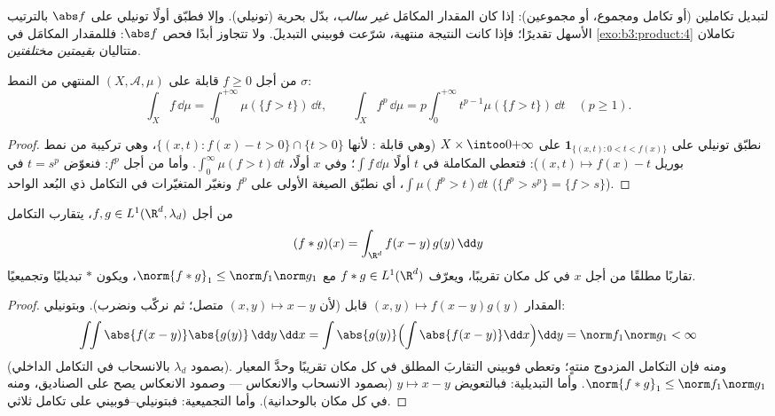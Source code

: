 \begin{method}\label{met:b3:product:fubini}
لتبديل تكاملين (أو تكامل ومجموع، أو مجموعين): إذا كان المقدار
المكامَل \emph{غير سالب}، بدّل بحرية (تونيلي). وإلا فطبّق أولًا
تونيلي على $\abs f$ بالترتيب الأسهل تقديرًا؛ فإذا كانت النتيجة
منتهية، شرّعت فوبيني التبديلَ. ولا تتجاوز أبدًا فحص $\abs f$:
فللمقدار المكامَل في \cref{exo:b3:product:4} تكاملان متتاليان \emph{بقيمتين
مختلفتين}.
\end{method}

\begin{proposition}\label{prop:b3:product:layercake}
من أجل $f \geq 0$ قابلة  على $(X, \mathcal A, \mu)$ المنتهي من النمط
$\sigma$:
\[
\int_X f\,\dd\mu = \int_0^{+\infty}\mu(\{f > t\})\,\dd t,
\qquad
\int_X f^p\,\dd\mu = p\int_0^{+\infty}t^{p-1}\mu(\{f >
t\})\,\dd t \quad (p \geq 1).
\]
\end{proposition}

\begin{proof}
نطبّق تونيلي على $\mathbf 1_{\{(x,t) : 0 < t < f(x)\}}$ على $X
\times \intoo0{+\infty}$ (وهي قابلة : لأنها
$\{(x,t): f(x) - t
> 0\}\cap\{t > 0\}$، وهي تركيبة من نمط بوريل  $(x,t)\mapsto f(x) - t$):
فتعطي المكاملة في $t$ أولًا $\int f\,\dd\mu$؛ وفي $x$ أولًا،
$\int_0^\infty\mu(f >
t)\dd t$. وأما من أجل $f^p$: فنعوّض $t = s^p$ في $\int\mu(f^p > t)
\dd t$، أي نطبّق
الصيغة الأولى على $f^p$ ونغيّر المتغيّرات في التكامل ذي البُعد
الواحد ($\{f^p > s^p\} =
\{f > s\}$).
\end{proof}

\begin{theorem}\label{thm:b3:product:convolution}
من أجل $f, g \in L^1(\R^d, \lambda_d)$، يتقارب التكامل
\[
(f * g)(x) = \int_{\R^d} f(x - y)\,g(y)\,\dd y
\]
تقاربًا مطلقًا من أجل $x$ في كل مكان تقريبًا، ويعرّف $f * g \in
L^1(\R^d)$ مع
$\norm{f*g}_1 \leq \norm f_1\norm g_1$، ويكون $*$ تبديليًا وتجميعيًا.
\end{theorem}

\begin{proof}
المقدار $(x, y) \mapsto f(x-y)g(y)$ قابل  (لأن $(x,y)\mapsto x - y$ متصل؛ ثم نركّب ونضرب).
وبتونيلي:
\[
\int\!\!\int \abs{f(x-y)}\abs{g(y)}\,\dd y\,\dd x
= \int\abs{g(y)}\Bigl(\int\abs{f(x - y)}\dd x\Bigr)\dd y
= \norm f_1\norm g_1 < \infty
\]
(بصمود $\lambda_d$ بالانسحاب في التكامل الداخلي). ومنه فإن
التكامل المزدوج منتهٍ؛ وتعطي فوبيني التقاربَ المطلق في كل مكان
تقريبًا وحدَّ المعيار $\norm{f*g}_1 \leq \norm
f_1\norm g_1$. وأما التبديلية: فبالتعويض $y \mapsto x - y$
(بصمود الانسحاب والانعكاس --- وصمود الانعكاس يصح على الصناديق،
ومنه في كل مكان بالوحدانية). وأما التجميعية: فبتونيلي--فوبيني
على تكامل ثلاثي.
\end{proof}

